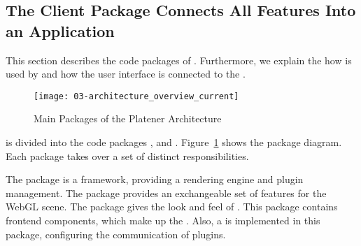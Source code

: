 \documentclass[../03-Architecture.tex]{subfiles}
\begin{document}


\subsection{The Client Package Connects All Features Into an
  Application}
\label{sec:client-to-application}


This section describes the code packages of {\platener}.
Furthermore, we explain the how {\convertify} is used by
{\platener} and how the user interface is connected to the
.



\begin{figure}
  \texttt{[image: 03-architecture\_overview\_current]}
  \caption{Main Packages of the Platener Architecture}
  \label{fig:architectureOverviewCurrent}
\end{figure}

{\platener} is divided into the code packages {\convertify},
 and .
Figure~\ref{fig:architectureOverviewCurrent} shows the
package diagram. Each package takes over a set of distinct
responsibilities.


The {\convertify} package is a framework, providing a
rendering engine and plugin management. The 
package provides an exchangeable set of features for the
WebGL scene. The  package gives the look and
feel of {\platener}. This package contains frontend
components, which make up the {\userinterface}. Also, a
 is implemented in this package,
configuring the communication of plugins.




\end{document}
